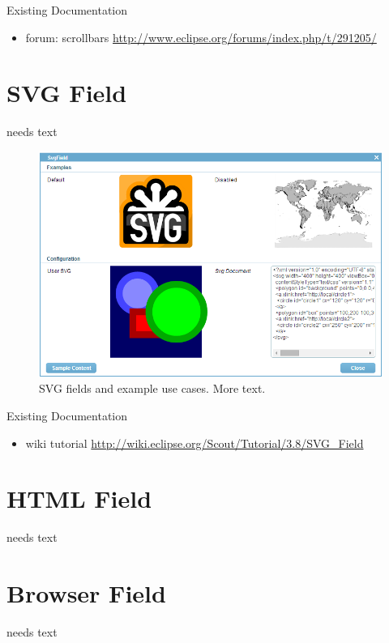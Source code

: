 \documentclass[a4paper,10pt,twoside]{book}
\begin{document}
{\noindent Existing Documentation
\begin{itemize}
  \item forum: scrollbars \url{http://www.eclipse.org/forums/index.php/t/291205/}
\end{itemize}

\section{SVG Field}
needs text

\begin{figure}
\includegraphics[width=15cm]{svgfield.png}
\caption{SVG fields and example use cases.
More text.}
\end{figure}

\noindent Existing Documentation
\begin{itemize}
  \item wiki tutorial \url{http://wiki.eclipse.org/Scout/Tutorial/3.8/SVG_Field}
\end{itemize}

\section{HTML Field}
needs text

\section{Browser Field}
needs text

}
\end{document}
